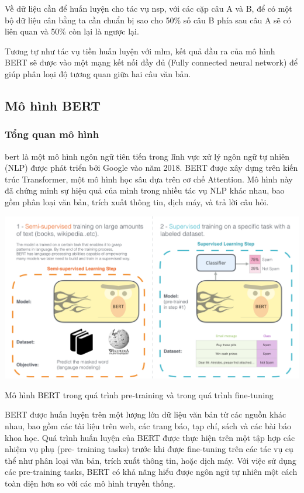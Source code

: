 \documentclass[a4paper, 12pt, openany]{book}
\begin{document}
Về dữ liệu cần để huấn luyện cho tác vụ \acl{nsp}, với các cặp câu A và B, để có một bộ dữ liệu cân bằng
ta cần chuẩn bị sao cho 50\% số câu B phía sau câu A sẽ có liên quan và 50\% còn lại là ngược lại.

Tương tự như tác vụ tiền huấn luyện với \acl{mlm}, kết quả đầu ra của mô hình BERT sẽ được vào một mạng kết nối đầy đủ
(Fully connected neural network) để giúp phân loại độ tương quan giữa hai câu văn bản.

\subsection{Mô hình BERT}
\subsubsection{Tổng quan mô hình}

\acl{bert} là một mô hình
ngôn ngữ tiên tiến trong lĩnh vực xử lý ngôn ngữ tự nhiên (NLP) được phát triển bởi
Google vào năm 2018. BERT được xây dựng trên kiến trúc Transformer, một mô hình học
sâu dựa trên cơ chế Attention. Mô hình này đã chứng minh sự hiệu quả của mình trong
nhiều tác vụ NLP khác nhau, bao gồm phân loại văn bản, trích xuất thông tin, dịch máy, và
trả lời câu hỏi.

\begin{minipage}{\linewidth}
    \captionsetup{type=figure}
    \centering
    \includegraphics[width=\linewidth]{./assets/images/BERT.png}
    \caption{Mô hình BERT trong quá trình pre-training và trong quá trình fine-tuning}
\end{minipage}
\vspace{0.5cm}

BERT được huấn luyện trên một lượng lớn dữ liệu văn bản từ các nguồn khác nhau,
bao gồm các tài liệu trên web, các trang báo, tạp chí, sách và các bài báo khoa học. Quá
trình huấn luyện của BERT được thực hiện trên một tập hợp các nhiệm vụ phụ (pre-
training tasks) trước khi được fine-tuning trên các tác vụ cụ thể như phân loại văn bản,
trích xuất thông tin, hoặc dịch máy. Với việc sử dụng các pre-training tasks,
BERT có khả năng hiểu được ngôn ngữ tự nhiên một cách toàn diện hơn so với các mô
hình truyền thống.
\end{document}
